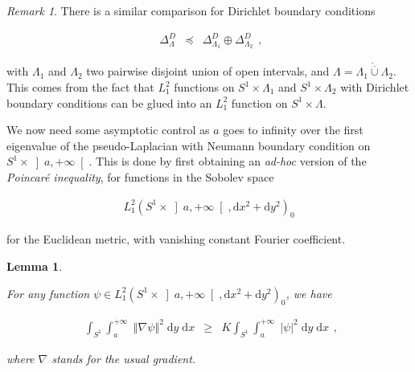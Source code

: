 \documentclass{jams-l}
\newtheorem{lemma}[theorem]{Lemma}
\theoremstyle{definition}
\theoremstyle{remark}
\newtheorem{remark}[theorem]{Remark}
\numberwithin{equation}{section}
\begin{document}
        \begin{remark}
        
            There is a similar comparison for Dirichlet boundary conditions
            
            \[ \begin{array}{lll}
                    \Delta^D_{\Lambda} & \preccurlyeq & \Delta^D_{\Lambda_1} \oplus \Delta^D_{\Lambda_2}
                \end{array} , \]
            
            \noindent with $\Lambda_1$ and $\Lambda_2$ two pairwise disjoint union of open intervals, and $\Lambda = \mathring{\overline{\Lambda_1 \cup \Lambda_2}}$. This comes from the fact that $L_1^2$ functions on $S^1 \times \Lambda_1$ and $S^1 \times \Lambda_2$ with Dirichlet boundary conditions can be glued into an $L_1^2$ function on $S^1 \times \Lambda$.
        
        \end{remark}
        
        We now need some asymptotic control as $a$ goes to infinity over the first eigenvalue of the pseudo-Laplacian with Neumann boundary condition on $S^1 \times \left] a, +\infty \right[$. This is done by first obtaining an \textit{ad-hoc} version of the \textit{Poincaré inequality}, for functions in the Sobolev space
        
        \[ \begin{array}{lll}
                L_1^2 \left( S^1 \times \left] a, + \infty \right[, \mathrm{d}x^2 + \mathrm{d}y^2 \right)_0
            \end{array} \]
        
        \noindent for the Euclidean metric, with vanishing constant Fourier coefficient.
        
        \begin{lemma}
        \label{LemmaPoincaréInequality}
        
            For any function $\psi \in L_1^2 \left( S^1 \times \left] a, + \infty \right[, \mathrm{d}x^2 + \mathrm{d}y^2 \right)_0$, we have
            
             \[ \begin{array}{lll}
                    \int_{S^1} \int_{a}^{+ \infty} \; \left \Vert \nabla \psi \right \Vert^2 \; \mathrm{d}y \; \mathrm{d}x & \geqslant & K \int_{S^1} \int_a^{+ \infty} \; \left \vert \psi \right \vert^2 \; \mathrm{d}y \; \mathrm{d}x
                \end{array} , \]
            
            \noindent where $\nabla$ stands for the usual gradient.
        
        \end{lemma}
        
\end{document}
